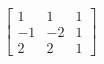 \[
  \left[
  \begin{array}{ccc}
	  1 & 1 & 1 \\
	  -1 & -2 & 1 \\
	  2 & 2 & 1
  \end{array}
  \right]
  \]